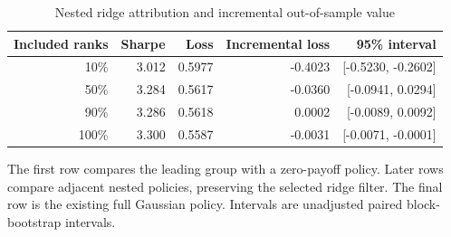 \begin{table}[htbp]
\centering\small{}
\caption{Nested ridge attribution and incremental out-of-sample value}\label{tab:nested}
\begin{tabular}{rrrrr}
\toprule
Included ranks & Sharpe & Loss & Incremental loss & 95\% interval \\
\midrule
10\% & 3.012 & 0.5977 & -0.4023 & [-0.5230, -0.2602] \\
50\% & 3.284 & 0.5617 & -0.0360 & [-0.0941, 0.0294] \\
90\% & 3.286 & 0.5618 & 0.0002 & [-0.0089, 0.0092] \\
100\% & 3.300 & 0.5587 & -0.0031 & [-0.0071, -0.0001] \\
\bottomrule
\end{tabular}
\par\vspace{5pt}
\begin{minipage}{\textwidth}\footnotesize The first row compares the leading group with a zero-payoff policy. Later rows compare adjacent nested policies, preserving the selected ridge filter. The final row is the existing full Gaussian policy. Intervals are unadjusted paired block-bootstrap intervals.\end{minipage}
\end{table}
